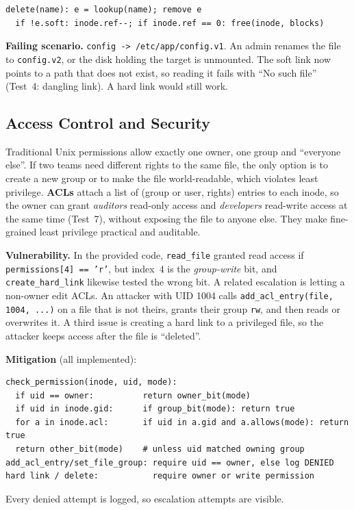 \documentclass[11pt]{article}
\begin{document}
\begin{lstlisting}
delete(name): e = lookup(name); remove e
  if !e.soft: inode.ref--; if inode.ref == 0: free(inode, blocks)
\end{lstlisting}

\textbf{Failing scenario.} \texttt{config -> /etc/app/config.v1}. An admin
renames the file to \texttt{config.v2}, or the disk holding the target is
unmounted. The soft link now points to a path that does not exist, so
reading it fails with ``No such file'' (Test~4: dangling link). A hard link
would still work.

\subsection{Access Control and Security}
Traditional Unix permissions allow exactly one owner, one group and
``everyone else''. If two teams need different rights to the same file,
the only option is to create a new group or to make the file
world-readable, which violates least privilege. \textbf{ACLs} attach a list
of (group or user, rights) entries to each inode, so the owner can grant
\emph{auditors} read-only access and \emph{developers} read-write access at
the same time (Test~7), without exposing the file to anyone else. They make
fine-grained least privilege practical and auditable.

\textbf{Vulnerability.} In the provided code, \texttt{read\_file} granted
read access if \texttt{permissions[4] == 'r'}, but index~4 is the
\emph{group-write} bit, and \texttt{create\_hard\_link} likewise tested
the wrong bit. A related escalation is letting a non-owner edit ACLs. An
attacker with UID 1004 calls \texttt{add\_acl\_entry(file, 1004, ...)} on
a file that is not theirs, grants their group \texttt{rw}, and then
reads or overwrites it. A third issue is creating a hard link to a
privileged file, so the attacker keeps access after the file is ``deleted''.

\textbf{Mitigation} (all implemented):
\begin{lstlisting}
check_permission(inode, uid, mode):
  if uid == owner:          return owner_bit(mode)
  if uid in inode.gid:      if group_bit(mode): return true
  for a in inode.acl:       if uid in a.gid and a.allows(mode): return true
  return other_bit(mode)    # unless uid matched owning group
add_acl_entry/set_file_group: require uid == owner, else log DENIED
hard link / delete:           require owner or write permission
\end{lstlisting}
Every denied attempt is logged, so escalation attempts are visible.
\end{document}
